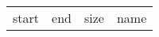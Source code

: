 \documentclass{article}
\begin{document}
\begin{center}
\begin{tabular}{ c c c c }
  start & end & size & name \\
  
\end{tabular}
\end{center}


\end{document}
